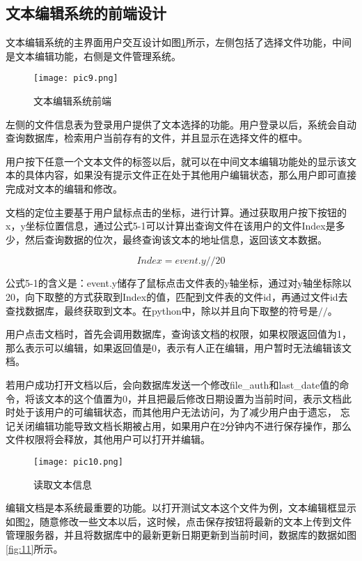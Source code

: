 \documentclass[forprint]{software}
\begin{document}
\subsection{文本编辑系统的前端设计}

文本编辑系统的主界面用户交互设计如图\ref{fig:9}所示，左侧包括了选择文件功能，中间是文本编辑功能，右侧是文件管理系统。

\begin{figure}[!htbp]
	\centering
	\texttt{[image: pic9.png]}
	\caption{文本编辑系统前端}
	\label{fig:9}
\end{figure}

左侧的文件信息表为登录用户提供了文本选择的功能。用户登录以后，系统会自动查询数据库，检索用户当前存有的文件，并且显示在选择文件的框中。

用户按下任意一个文本文件的标签以后，就可以在中间文本编辑功能处的显示该文本的具体内容，如果没有提示文件正在处于其他用户编辑状态，那么用户即可直接完成对文本的编辑和修改。

文档的定位主要基于用户鼠标点击的坐标，进行计算。通过获取用户按下按钮的x，y坐标位置信息，通过公式5-1可以计算出查询文件在该用户的文件Index是多少，然后查询数据的位次，最终查询该文本的地址信息，返回该文本数据。

\begin{equation}
	Index = event.y // 20
\end{equation}

公式5-1的含义是：event.y储存了鼠标点击文件表的y轴坐标，通过对y轴坐标除以20，向下取整的方式获取到Index的值，匹配到文件表的文件id，再通过文件id去查找数据库，最终获取到文本。在python中，除以并且向下取整的符号是$//$。

用户点击文档时，首先会调用数据库，查询该文档的权限，如果权限返回值为1，那么表示可以编辑，如果返回值是0，表示有人正在编辑，用户暂时无法编辑该文档。

若用户成功打开文档以后，会向数据库发送一个修改file\_auth和last\_date值的命令，将该文本的这个值置为0，并且把最后修改日期设置为当前时间，表示文档此时处于该用户的可编辑状态，而其他用户无法访问，为了减少用户由于遗忘， 忘记关闭编辑功能导致文档长期被占用，如果用户在2分钟内不进行保存操作，那么文件权限将会释放，其他用户可以打开并编辑。

\begin{figure}[!htbp]
	\centering
	\texttt{[image: pic10.png]}
	\caption{读取文本信息}
	\label{fig:10}
\end{figure}

编辑文档是本系统最重要的功能。以打开测试文本这个文件为例，文本编辑框显示如图\ref{fig:10}，随意修改一些文本以后，这时候，点击保存按钮将最新的文本上传到文件管理服务器，并且将数据库中的最新更新日期更新到当前时间，数据库的数据如图\ref{fig:11}所示。
\end{document}
